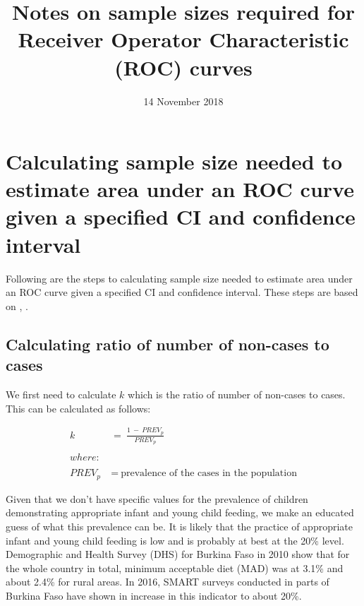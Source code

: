 \documentclass[12pt,a4paper]{article}
\title{Notes on sample sizes required for Receiver Operator Characteristic
(ROC) curves}
\author{}
\date{14 November 2018}
\theoremstyle{definition}
\theoremstyle{definition}
\theoremstyle{definition}
\theoremstyle{remark}
\begin{document}
\maketitle

\hypertarget{calculating-sample-size-needed-to-estimate-area-under-an-roc-curve-given-a-specified-ci-and-confidence-interval}{%
\section{Calculating sample size needed to estimate area under an ROC
curve given a specified CI and confidence
interval}\label{calculating-sample-size-needed-to-estimate-area-under-an-roc-curve-given-a-specified-ci-and-confidence-interval}}

Following are the steps to calculating sample size needed to estimate
area under an ROC curve given a specified CI and confidence interval.
These steps are based on \citet{Obuchowski1118}, \citet{Obuchowski2005}.

\hypertarget{calculating-ratio-of-number-of-non-cases-to-cases}{%
\subsection{Calculating ratio of number of non-cases to
cases}\label{calculating-ratio-of-number-of-non-cases-to-cases}}

We first need to calculate \(k\) which is the ratio of number of
non-cases to cases. This can be calculated as follows:

\[ \begin{aligned}
k ~ & = ~ \frac{1 ~ - ~ PREV_p}{PREV_p} \\
\\
where: & \\
\\
PREV_p ~ & = ~ \text{prevalence of the cases in the population}
\end{aligned} \]

Given that we don't have specific values for the prevalence of children
demonstrating appropriate infant and young child feeding, we make an
educated guess of what this prevalence can be. It is likely that the
practice of appropriate infant and young child feeding is low and is
probably at best at the 20\% level. Demographic and Health Survey (DHS)
for Burkina Faso in 2010 show that for the whole country in total,
minimum acceptable diet (MAD) was at 3.1\% and about 2.4\% for rural
areas. In 2016, SMART surveys conducted in parts of Burkina Faso have
shown in increase in this indicator to about 20\%.
\end{document}
